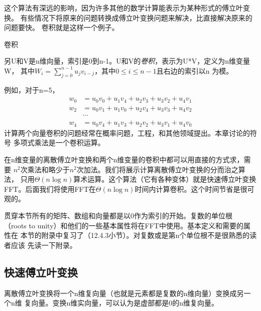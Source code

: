 这个算法有深远的影响，因为许多其他的数学计算能表示为某种形式的傅立叶变换。
有些情况下将原来的问题转换成傅立叶变换问题来解决，比直接解决原来的问题要快。
卷积就是这样一个例子。

\begin{definition}
卷积

另U和V是n维向量，索引是0到n-1。U和V的\emph{卷积}，表示为U*V，定义为n维变量W，
其中$W_i=\sum_{j=0}^{n-1}u_jv_{i-j} $，其中$0\leq i \leq n-1$且右边的索引以n
为模。
\end{definition}

例如，对于n=5，
\begin{displaymath}
\begin{aligned}
w_0&=u_0v_0+u_1v_4+u_2v_3+u_3v_2+u_4v_1 \\
w_2&=u_0v_1+u_1v_0+u_2v_4+u_3v_3+u_4v_2 \\
    &\cdots \\
w_4&=u_0v_4+u_1v_3+u_2v_2+u_3v_1+u_4v_0
\end{aligned}
\end{displaymath}
计算两个向量卷积的问题经常在概率问题，工程，和其他领域提出。本章讨论的符号
多项式乘法是一个卷积运算。

在n维变量的离散傅立叶变换和两个n维变量的卷积中都可以用直接的方式求，需要
$n^2$次乘法和略少于$n^2$次加法。我们将展示计算离散傅立叶变换的分而治之算法，
只用$\Theta(n\log n)$算术运算。这个算法（它有各种变体）就是快速傅立叶变换
FFT。后面我们将使用FFT在$\Theta(n\log n)$时间内计算卷积。这个时间节省是很可观的。

贯穿本节所有的矩阵、数组和向量都是以0作为索引的开始。复数的单位根
（roots to unity）和他们的一些基本属性将在FFT中使用。基本定义和需要的属性在
本节的附录中复习了（12.4.3小节）。对复数或是第n个单位根不是很熟悉的读者应该
先读一下附录。

\subsection{快速傅立叶变换}
离散傅立叶变换将一个n维复向量（也就是元素都是复数的n维向量）变换成另一个n维
复向量。变换n维实向量，可以认为是虚部都是0的n维复向量。

